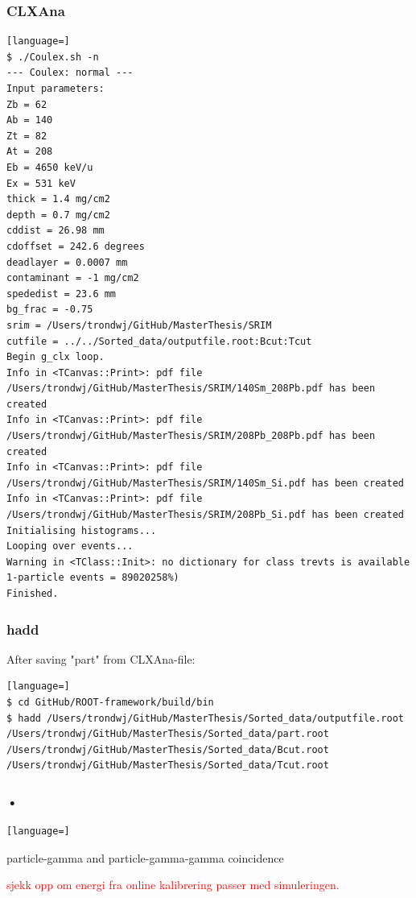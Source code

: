 \documentclass[twoside,english]{uiofysmaster/uiofysmaster}
\begin{document}
\subsubsection{CLXAna}
\begin{lstlisting}[language=]
$ ./Coulex.sh -n
--- Coulex: normal ---
Input parameters:
Zb = 62
Ab = 140
Zt = 82
At = 208
Eb = 4650 keV/u
Ex = 531 keV
thick = 1.4 mg/cm2
depth = 0.7 mg/cm2
cddist = 26.98 mm
cdoffset = 242.6 degrees
deadlayer = 0.0007 mm
contaminant = -1 mg/cm2
spededist = 23.6 mm
bg_frac = -0.75
srim = /Users/trondwj/GitHub/MasterThesis/SRIM
cutfile = ../../Sorted_data/outputfile.root:Bcut:Tcut
Begin g_clx loop.
Info in <TCanvas::Print>: pdf file /Users/trondwj/GitHub/MasterThesis/SRIM/140Sm_208Pb.pdf has been created
Info in <TCanvas::Print>: pdf file /Users/trondwj/GitHub/MasterThesis/SRIM/208Pb_208Pb.pdf has been created
Info in <TCanvas::Print>: pdf file /Users/trondwj/GitHub/MasterThesis/SRIM/140Sm_Si.pdf has been created
Info in <TCanvas::Print>: pdf file /Users/trondwj/GitHub/MasterThesis/SRIM/208Pb_Si.pdf has been created
Initialising histograms...
Looping over events...
Warning in <TClass::Init>: no dictionary for class trevts is available
1-particle events = 89020258%)    
Finished.
\end{lstlisting}


\subsubsection{hadd}
After saving "part" from CLXAna-file:
\begin{lstlisting}[language=]
$ cd GitHub/ROOT-framework/build/bin
$ hadd /Users/trondwj/GitHub/MasterThesis/Sorted_data/outputfile.root /Users/trondwj/GitHub/MasterThesis/Sorted_data/part.root /Users/trondwj/GitHub/MasterThesis/Sorted_data/Bcut.root /Users/trondwj/GitHub/MasterThesis/Sorted_data/Tcut.root 
\end{lstlisting}


\subsubsection{•}
\begin{lstlisting}[language=]
\end{lstlisting}


\bigskip

particle-gamma and particle-gamma-gamma coincidence

\textcolor{red}{sjekk opp om energi fra online kalibrering passer med simuleringen.}
\end{document}

